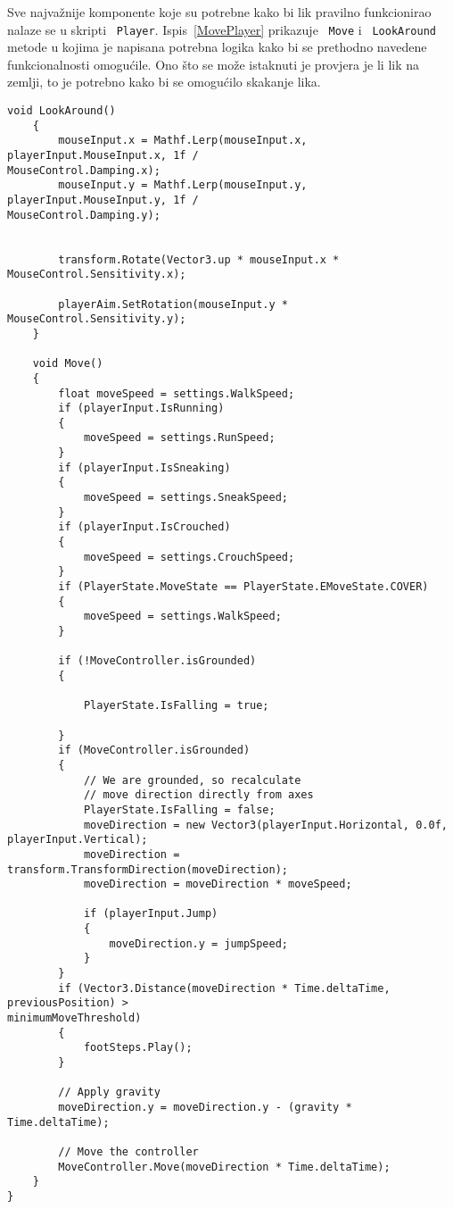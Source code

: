 Sve najvažnije komponente koje su potrebne kako bi lik pravilno funkcionirao nalaze
se u skripti ~\texttt{Player}. Ispis~\ref{MovePlayer} prikazuje ~\texttt{Move} i ~\texttt{LookAround} metode u
kojima je napisana potrebna logika kako bi se prethodno navedene funkcionalnosti
omogućile. Ono što se može istaknuti je provjera je li lik na zemlji, to je potrebno
kako bi se omogućilo skakanje lika.
\begin{lstlisting}[caption={LookAround i Move metode}, label=MovePlayer]
    void LookAround()
    {
        mouseInput.x = Mathf.Lerp(mouseInput.x, playerInput.MouseInput.x, 1f /
MouseControl.Damping.x);
        mouseInput.y = Mathf.Lerp(mouseInput.y, playerInput.MouseInput.y, 1f /
MouseControl.Damping.y);


        transform.Rotate(Vector3.up * mouseInput.x * MouseControl.Sensitivity.x);

        playerAim.SetRotation(mouseInput.y * MouseControl.Sensitivity.y);
    }

    void Move()
    {
        float moveSpeed = settings.WalkSpeed;
        if (playerInput.IsRunning)
        {
            moveSpeed = settings.RunSpeed;
        }
        if (playerInput.IsSneaking)
        {
            moveSpeed = settings.SneakSpeed;
        }
        if (playerInput.IsCrouched)
        {
            moveSpeed = settings.CrouchSpeed;
        }
        if (PlayerState.MoveState == PlayerState.EMoveState.COVER)
        {
            moveSpeed = settings.WalkSpeed;
        }
       
        if (!MoveController.isGrounded)
        {

            PlayerState.IsFalling = true;

        }
        if (MoveController.isGrounded)
        {
            // We are grounded, so recalculate
            // move direction directly from axes
            PlayerState.IsFalling = false;
            moveDirection = new Vector3(playerInput.Horizontal, 0.0f,
playerInput.Vertical);
            moveDirection = transform.TransformDirection(moveDirection);
            moveDirection = moveDirection * moveSpeed;

            if (playerInput.Jump)
            {
                moveDirection.y = jumpSpeed;
            }
        }
        if (Vector3.Distance(moveDirection * Time.deltaTime, previousPosition) >
minimumMoveThreshold)
        {
            footSteps.Play();
        }

        // Apply gravity
        moveDirection.y = moveDirection.y - (gravity * Time.deltaTime);

        // Move the controller
        MoveController.Move(moveDirection * Time.deltaTime);
    }
}
\end{lstlisting}

